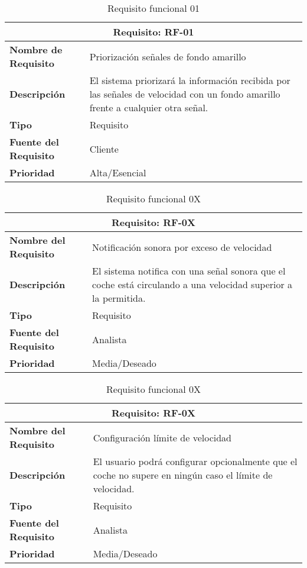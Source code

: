 \begin{table}[H]
\begin{center}
\begin{tabular}{p{} p{7cm}}
\multicolumn{2}{c}{\textbf{Requisito: RF-01} } \\
\hline \hline
\textbf{Nombre de Requisito} & Priorización señales de fondo amarillo \\
\hline
\textbf{Descripción} & El sistema priorizará la información recibida por las señales de velocidad con un fondo amarillo frente a cualquier otra señal. \\
\hline
\textbf{Tipo} & Requisito \\
\hline
\textbf{Fuente del Requisito} & Cliente \\
\hline
\textbf{Prioridad} & Alta/Esencial \\ \hline
\end{tabular}
\caption{Requisito funcional 01}
\label{tab:personal}
\end{center}
\end{table}

\begin{table}[H]
\begin{center}
\begin{tabular}{p{} p{7cm}}
\multicolumn{2}{c}{\textbf{Requisito: RF-0X} } \\
\hline \hline
\textbf{Nombre del Requisito} & Notificación sonora por exceso de velocidad \\
\hline
\textbf{Descripción} & El sistema notifica con una señal sonora que el coche está circulando a una velocidad superior a la permitida. \\
\hline
\textbf{Tipo} & Requisito  \\
\hline
\textbf{Fuente del Requisito} & Analista  \\
\hline
\textbf{Prioridad} & Media/Deseado  \\ \hline
\end{tabular}
\caption{Requisito funcional 0X}
\label{tab:personal}
\end{center}
\end{table}

\begin{table}[H]
\begin{center}
\begin{tabular}{p{} p{7cm}}
\multicolumn{2}{c}{\textbf{Requisito: RF-0X} } \\
\hline \hline
\textbf{Nombre del Requisito} & Configuración límite de velocidad \\
\hline
\textbf{Descripción} & El usuario podrá configurar opcionalmente que el coche no supere en ningún caso el límite de velocidad. \\
\hline
\textbf{Tipo} & Requisito  \\
\hline
\textbf{Fuente del Requisito} & Analista  \\
\hline
\textbf{Prioridad} & Media/Deseado  \\ \hline
\end{tabular}
\caption{Requisito funcional 0X}
\label{tab:personal}
\end{center}
\end{table}

